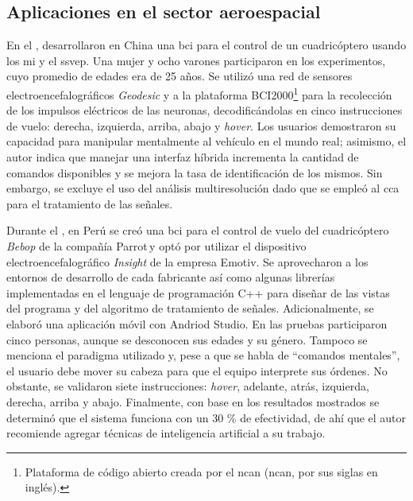     \subsection*{Aplicaciones en el sector aeroespacial}
    
    En el \citeyear{Duan2019}, \citet{Duan2019} desarrollaron en China una \acrlong{bci} para el control de un cuadricóptero usando los \acrfull{mi} y el \acrfull{ssvep}. Una mujer y ocho varones participaron en los experimentos, cuyo promedio de edades era de 25 años. Se utilizó una red de sensores electroencefalográficos \textit{Geodesic} y a la plataforma BCI2000\footnote{Plataforma de código abierto creada por el \acrlong{ncan} (\acrshort{ncan}\textregistered, por sus siglas en inglés).} para la recolección de los impulsos eléctricos de las neuronas, decodificándolas en cinco instrucciones de vuelo: derecha, izquierda, arriba, abajo y \textit{hover}. Los usuarios demostraron su capacidad para manipular mentalmente al vehículo en el mundo real; asimismo, el autor indica que manejar una interfaz híbrida incrementa la cantidad de comandos disponibles y se mejora la tasa de identificación de los mismos. Sin embargo, se excluye el uso del análisis multiresolución dado que se empleó al \acrfull{cca} para el tratamiento de las señales.
    
    Durante el \citeyear{MamaniMusaja2018}, en Perú se creó una \acrlong{bci} para el control de vuelo del cuadricóptero \textit{Bebop} de la compañía Parrot\textregistered\,y \citet{MamaniMusaja2018} optó por utilizar el dispositivo electroencefalográfico \textit{Insight} de la empresa Emotiv. Se aprovecharon a los entornos de desarrollo de cada fabricante así como algunas librerías implementadas en el lenguaje de programación C++ para diseñar de las vistas del programa y del algoritmo de tratamiento de señales. Adicionalmente, se elaboró una aplicación móvil con Andriod Studio\textregistered. En las pruebas participaron cinco personas, aunque se desconocen sus edades y su género. Tampoco se menciona el paradigma utilizado y, pese a que se habla de ``comandos mentales'', el usuario debe mover su cabeza para que el equipo interprete sus órdenes. No obstante, se validaron siete instrucciones: \textit{hover}, adelante, atrás, izquierda, derecha, arriba y abajo. Finalmente, con base en los resultados mostrados se determinó que el sistema funciona con un 30 \% de efectividad, de ahí que el autor recomiende agregar técnicas de inteligencia artificial a su trabajo.

